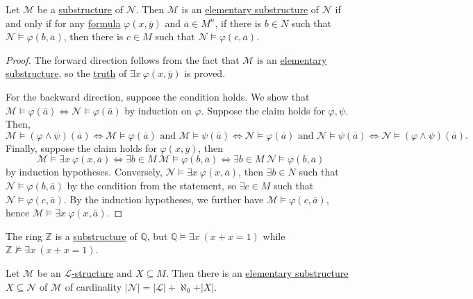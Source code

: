 \begin{proposition}\label{prop:Tarski-Vaught-test}
	Let \(\mathcal{M} \) be a \hyperref[def:substructure]{substructure} of \(\mathcal{N} \). Then \(\mathcal{M} \) is an \hyperref[def:elementary-substructure]{elementary substructure} of \(\mathcal{N} \) if and only if for any \hyperref[def:formula]{formula} \(\varphi (x, \overline{y} )\) and \(\overline{a} \in M^n\), if there is \(b\in N\) such that \(\mathcal{N} \models \varphi (b, \overline{a} )\), then there is \(c\in M\) such that \(\mathcal{N} \models \varphi (c, \overline{a} )\).
\end{proposition}
\begin{proof}
	The forward direction follows from the fact that \(\mathcal{M} \) is an \hyperref[def:elementary-substructure]{elementary substructure}, so the \hyperref[def:truth]{truth} of \(\exists x\ \varphi (x, \overline{y} )\) is proved.

	For the backward direction, suppose the condition holds. We show that \(\mathcal{M} \models \varphi (\overline{a} )\iff \mathcal{N} \models \varphi (\overline{a} )\) by induction on \(\varphi \). Suppose the claim holds for \(\varphi , \psi \). Then,
	\[
		\mathcal{M} \models (\varphi \land \psi )(\overline{a} )
		\iff \mathcal{M} \models \varphi (\overline{a} ) \text{ and } \mathcal{M} \models \psi (\overline{a} )
		\iff \mathcal{N} \models \varphi (\overline{a} ) \text{ and } \mathcal{N} \models \psi (\overline{a} )
		\iff \mathcal{N} \models (\varphi \land \psi )(\overline{a} ).
	\]
	Finally, suppose the claim holds for \(\varphi (x, \overline{y} )\), then
	\[
		\mathcal{M} \models \exists x\ \varphi (x, \overline{a} )
		\iff \exists b\in M\ \mathcal{M} \models \varphi (b, \overline{a} )
		\iff \exists b\in M\ \mathcal{N} \models \varphi (b, \overline{a} )
	\]
	by induction hypotheses. Conversely, \(\mathcal{N} \models \exists x\ \varphi (x, \overline{a} )\), then \(\exists b\in N\) such that \(\mathcal{N} \models \varphi (b, \overline{a} )\) by the condition from the statement, so \(\exists c\in M\) such that \(\mathcal{N} \models \varphi (c, \overline{a} )\). By the induction hypotheses, we further have \(\mathcal{M} \models \varphi (c, \overline{a} )\), hence \(\mathcal{M} \models \exists x\ \varphi (x, \overline{a} )\).
\end{proof}

\begin{eg}
	The ring \(\mathbb{Z} \) is a \hyperref[def:substructure]{substructure} of \(\mathbb{Q} \), but \(\mathbb{Q} \models \exists x\ (x+x=1)\) while \(\mathbb{Z} \not \models \exists x\ (x+x=1)\).
\end{eg}

\begin{theorem}\label{thm:downward-Lowenheim-Skolem}
	Let \(\mathcal{M} \) be an \hyperref[def:structure]{\(\mathcal{L} \)-structure} and \(X \subseteq M\). Then there is an \hyperref[def:elementary-substructure]{elementary substructure} \(X \subseteq \mathcal{N} \) of \(\mathcal{M} \) of cardinality \(\vert \mathcal{N} \vert = \vert \mathcal{L} \vert + \aleph_0 + \vert X \vert \).
\end{theorem}